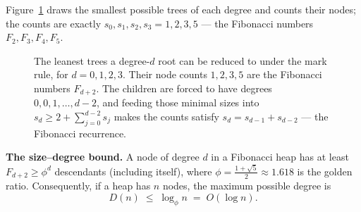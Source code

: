 Figure~\ref{ch20:mintrees} draws the smallest possible trees of each degree and
counts their nodes; the counts are exactly $s_0,s_1,s_2,s_3 = 1,2,3,5$ --- the
Fibonacci numbers $F_2,F_3,F_4,F_5$.

\begin{figure}[H]
\centering
{}
\caption{The leanest trees a degree-$d$ root can be reduced to under the mark rule,
for $d=0,1,2,3$. Their node counts $1,2,3,5$ are the Fibonacci numbers
$F_{d+2}$. The children are forced to have degrees $0,0,1,\ldots,d-2$, and feeding
those minimal sizes into $s_d \ge 2 + \sum_{j=0}^{d-2} s_j$ makes the counts
satisfy $s_d = s_{d-1} + s_{d-2}$ --- the Fibonacci recurrence.}
\label{ch20:mintrees}
\end{figure}

\begin{formalbox}
\textbf{The size--degree bound.} A node of degree $d$ in a Fibonacci heap has at
least $F_{d+2} \ge \phi^d$ descendants (including itself), where
$\phi = \tfrac{1+\sqrt5}{2} \approx 1.618$ is the golden ratio. Consequently, if a
heap has $n$ nodes, the maximum possible degree is
\[
  D(n) \;\le\; \log_\phi n \;=\; O(\log n).
\]
\end{formalbox}


